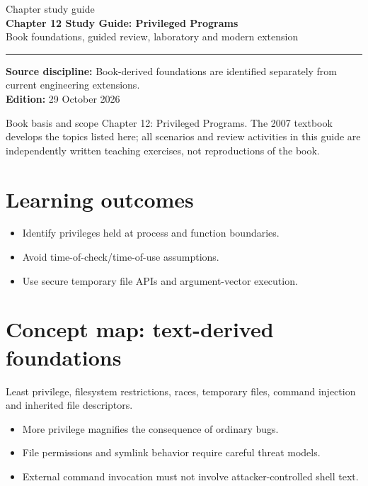 \documentclass[10pt,letterpaper]{article}
\begin{document}
\hypersetup{pageanchor=false}%
\begin{titlepage}
\vspace*{1.0in}
{\color{bluegray}\Large Chapter study guide}\\[1.0em]
{\color{navy}\Huge\bfseries Chapter 12 Study Guide: Privileged Programs}\\[0.7em]
{\Large Book foundations, guided review, laboratory and modern extension}\\[2.0em]
\rule{\linewidth}{1.0pt}
\vfill
\textbf{Source discipline:} Book-derived foundations are identified separately from current engineering extensions.\\
\textbf{Edition:} 29 October 2026
\end{titlepage}\hypersetup{pageanchor=true}
\tableofcontents
\clearpage
\begin{focusbox}{Book basis and scope}
Chapter 12: Privileged Programs. The 2007 textbook develops the topics listed here; all scenarios and review activities in this guide are independently written teaching exercises, not reproductions of the book.\end{focusbox}
\section{Learning outcomes}
\begin{itemize}
\item Identify privileges held at process and function boundaries.
\item Avoid time-of-check/time-of-use assumptions.
\item Use secure temporary file APIs and argument-vector execution.
\end{itemize}

\section{Concept map: text-derived foundations}
Least privilege, filesystem restrictions, races, temporary files, command injection and inherited file descriptors.
\begin{itemize}
\item More privilege magnifies the consequence of ordinary bugs.
\item File permissions and symlink behavior require careful threat models.
\item External command invocation must not involve attacker-controlled shell text.
\end{itemize}
\end{document}
